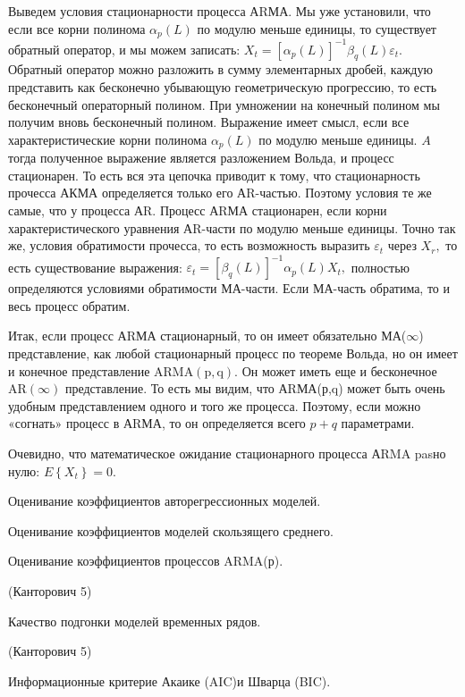 \documentclass[a4paper,8pt]{article} %
\begin{document}
Выведем условия стационарности процесса АRМА. Мы уже установили, что если все корни полинома $\alpha_{p}(L)$ по модулю меньше единицы, то существует обратный оператор, и мы можем записать: $X_{t}=\left[\alpha_{p}(L)\right]^{-1} \beta_{q}(L) \varepsilon_{t} .$ Обратный оператор можно разложить в сумму элементарных дробей, каждую представить как бесконечно убывающую геометрическую прогрессию, то есть бесконечный операторный полином. При умножении на конечный полином мы получим вновь бесконечный полином. Выражение имеет смысл, если все характеристические корни полинома $\alpha_{p}(L)$ по модулю меньше единицы. $A$ тогда полученное выражение является разложением Вольда, и процесс стационарен. То есть вся эта цепочка приводит к тому, что стационарность прочесса АКМА определяется только его АR-частью. Поэтому условия те же самые, что у процесса АR. Процесс АRМА стационарен, если корни характеристического уравнения АR-части по модулю меньше единицы. Точно так же, условия обратимости прочесса, то есть возможность выразить
$\varepsilon_{t}$ через $X_{r},$ то есть существование выражения: $\varepsilon_{t}=\left[\beta_{q}(L)\right]^{-1} \alpha_{p}(L) X_{t},$ полностью определяются условиями обратимости МА-части. Если МА-часть обратима, то и весь процесс обратим.

Итак, если процесс АRМА стационарный, то он имеет обязательно МА($\infty$) представление, как любой стационарный процесс по теореме Вольда, но он имеет и конечное представление $\mathrm{ARMA}(\mathrm{p}, \mathrm{q}) .$ Он может иметь еще и бесконечное $\mathrm{AR}(\infty)$ представление. То есть мы видим, что АRМА(р,q) может быть очень удобным представлением одного и того же процесса. Поэтому, если можно «согнать» процесс в АRМА, то он определяется всего $p+q$ параметрами.

Очевидно, что математическое ожидание стационарного процесса АRMA pasно нулю: $E\left\{X_{t}\right\}=0 .$



Оценивание  коэффициентов  авторегрессионных  моделей.  

Оценивание  коэффициентов моделей  скользящего  среднего.  

Оценивание  коэффициентов  процессов ARMA(р).  

(Канторович 5)

Качество подгонки моделей временных рядов. 

(Канторович 5)

Информационные критерие Акаике (AIC)и Шварца (BIC). 
\end{document}
